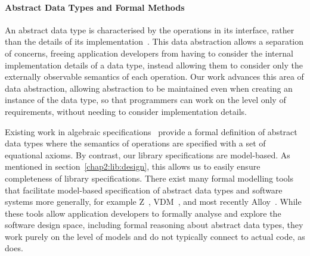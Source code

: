 \paragraph*{Abstract Data Types and Formal Methods}
An abstract data type is characterised by the operations in its interface, rather than the details of its implementation~\citep{10.1145/942572.807045}. 
This data abstraction allows a separation of concerns, freeing application developers from having to consider the internal implementation details of a data type, instead allowing them to consider only the externally observable 
semantics of each operation. Our work advances this area of data abstraction, allowing abstraction to be maintained even when creating an instance of the data type, so that programmers can work on the level only of requirements,
without needing to consider implementation details.

Existing work in algebraic specifications~\citep{10.1145/800237.807124, WIRSING1990675} provide a formal definition of abstract data types where the semantics of operations are specified with a set of equational axioms.
By contrast, our library specifications are model-based. As mentioned in section~\ref{chap2:lib:design}, this allows us to easily ensure completeness of library specifications.
There exist many formal modelling tools that facilitate model-based specification of abstract data types and software systems more generally, for example Z~\citep{znotation}, VDM~\citep{vdm}, and most recently Alloy~\citep{alloy}. While these tools allow 
application developers to formally analyse and explore the software design space, including formal reasoning about abstract data types, they work purely on the level of models and do not typically connect
to actual code, as \Primrose{} does. 

